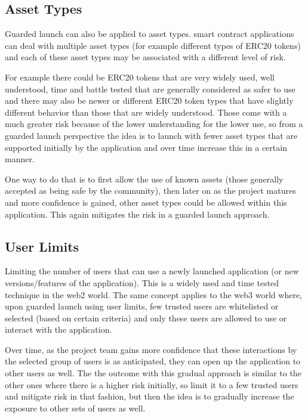 \subsection{Asset Types}\label{asset-types}

Guarded launch can also be applied to asset types. smart contract
applications can deal with multiple asset types (for example different
types of ERC20 tokens) and each of these asset types may be associated
with a different level of risk.

For example there could be ERC20 tokens that are very widely used, well
understood, time and battle tested that are generally considered as
safer to use and there may also be newer or different ERC20 token types
that have slightly different behavior than those that are widely
understood. Those come with a much greater risk because of the lower
understanding for the lower use, so from a guarded launch perspective
the idea is to launch with fewer asset types that are supported
initially by the application and over time increase this in a certain
manner.

One way to do that is to first allow the use of known assets (those
generally accepted as being safe by the community), then later on as the
project matures and more confidence is gained, other asset types could
be allowed within this application. This again mitigates the risk in a
guarded launch approach.

\subsection{User Limits}\label{user-limits}

Limiting the number of users that can use a newly launched application
(or new versions/features of the application). This is a widely used and
time tested technique in the web2 world. The same concept applies to the
web3 world where, upon guarded launch using user limits, few trusted
users are whitelisted or selected (based on certain criteria) and only
these users are allowed to use or interact with the application.

Over time, as the project team gains more confidence that these
interactions by the selected group of users is as anticipated, they can
open up the application to other users as well. The the outcome with
this gradual approach is similar to the other ones where there is a
higher risk initially, so limit it to a few trusted users and mitigate
risk in that fashion, but then the idea is to gradually increase the
exposure to other sets of users as well.

